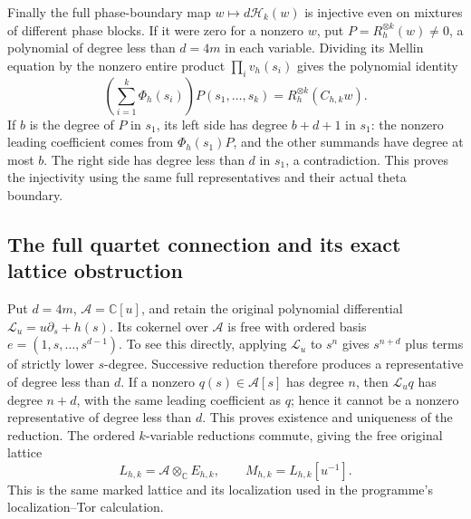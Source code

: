 Finally the full phase-boundary map
\(w\mapsto d\mathcal H_k(w)\) is injective even on mixtures of
different phase blocks. If it were zero for a nonzero \(w\), put
\(P=R_h^{\otimes k}(w)\ne0\), a polynomial of degree less than
\(d=4m\) in each variable. Dividing its Mellin equation by the
nonzero entire product \(\prod_i v_h(s_i)\) gives the polynomial
identity
\[
 \left(\sum_{i=1}^k\Phi_h(s_i)\right)P(s_1,\ldots,s_k)
       =R_h^{\otimes k}(C_{h,k}w).
 \tag{QPS.28}
\]
If \(b\) is the degree of \(P\) in \(s_1\), its left side has
degree \(b+d+1\) in \(s_1\): the nonzero leading coefficient
comes from \(\Phi_h(s_1)P\), and the other summands have degree
at most \(b\). The right side has degree less than \(d\) in
\(s_1\), a contradiction. This proves the injectivity using the
same full representatives and their actual theta boundary.

\subsection{The full quartet connection and its exact lattice obstruction}

Put \(d=4m\), \(\mathcal A=\mathbb C[u]\), and retain the
original polynomial differential
\(\mathcal L_u=u\partial_s+h(s)\). Its cokernel over \(\mathcal A\)
is free with ordered basis
\(e=(1,s,\ldots,s^{d-1})\). To see this directly, applying
\(\mathcal L_u\) to \(s^n\) gives \(s^{n+d}\) plus terms of
strictly lower \(s\)-degree. Successive reduction therefore
produces a representative of degree less than \(d\). If a nonzero
\(q(s)\in\mathcal A[s]\) has degree \(n\), then
\(\mathcal L_uq\) has degree \(n+d\), with the same leading
coefficient as \(q\); hence it cannot be a nonzero representative
of degree less than \(d\). This proves existence and uniqueness
of the reduction. The ordered \(k\)-variable reductions commute,
giving the free original lattice
\[
 L_{h,k}=\mathcal A\otimes_{\mathbb C}E_{h,k},\qquad
 M_{h,k}=L_{h,k}[u^{-1}].
 \tag{QPS.29}
\]
This is the same marked lattice and its localization used in the
programme's localization--Tor calculation.

